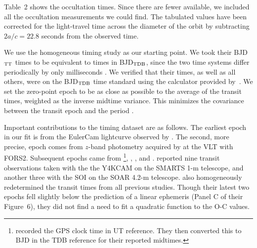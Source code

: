 \documentclass[12pt,twocolumn,tighten]{aastex62}
\begin{document}
Table~2 shows the occultation times.  Since there are fewer available,
we included all the occultation measurements we could find. The
tabulated values have been corrected for the light-travel time across
the diameter of the orbit by subtracting $2a/c = 22.8$ seconds from
the observed time.

We use the homogeneous \citet{hoyer_tramos_2013} timing study as our
starting point.  We took their BJD$_{\rm TT}$ times to be equivalent to
times in BJD$_{\rm TDB}$, since the two time systems differ periodically
by only milliseconds \citep{urban_explanatory_2012}.  We verified that
their times, as well as all others, were on the BJD$_{\rm TDB}$ time
standard using the calculator provided
by~\citet{eastman_achieving_2010}.  We set the zero-point epoch to be as
close as possible to the average of the transit times, weighted as the
inverse midtime variance. This minimizes the covariance between the
transit epoch and the period \citep{gibson_gemini_2013}.

Important contributions to the timing dataset are as follows.  The
earliest epoch in our fit is from the EulerCam lightcurve observed by
\citet{wilson_wasp-4b_2008}.  The second, more precise, epoch comes from
$z$-band photometry acquired by \citet{gillon_improved_2009} at the VLT
with FORS2.  Subsequent epochs came from
\citet{winn_transit_2009}\footnote{\citet{winn_transit_2009} recorded
the GPS clock time in UT reference. They then converted this to BJD in
the TDB reference for their reported midtimes.},
\citet{dragomir_terms_2011}, \citet{sanchis-ojeda_starspots_2011}, and
\citet{nikolov_wasp-4b_2012}.
\citet{hoyer_tramos_2013} reported nine transit observations taken with
the the Y4KCAM on the SMARTS 1-m telescope, and another three with the
SOI on the SOAR 4.2-m telescope.  \citet{hoyer_tramos_2013} also
homogeneously redetermined the transit times from all previous studies.
Though their latest two epochs fell slightly below the prediction of a
linear ephemeris (Panel C of their Figure~6), they did not find a need
to fit a quadratic function to the O-C values.
\end{document}
